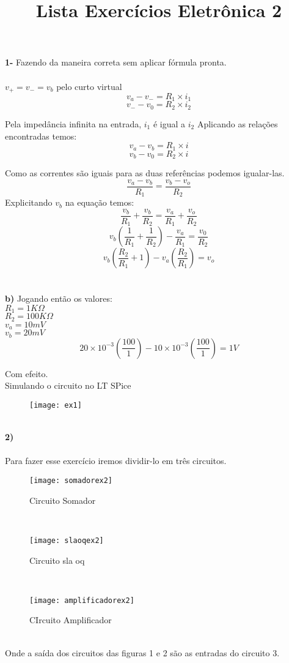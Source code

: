 \documentclass[11pt,a4paper]{article}
\title{Lista Exercícios Eletrônica 2}
\begin{document}
\maketitle
\textbf{1- }
Fazendo da maneira correta sem aplicar fórmula pronta.\\
\\
$v_+=v_-=v_b$ pelo curto virtual
$$v_a-v_-=R_1\times i_1$$
$$v_--v_0=R_2\times i_2$$

Pela impedância infinita na entrada, $i_1$ é igual a $i_2$ 
Aplicando as relações encontradas temos:
$$v_a-v_b=R_1\times i$$
$$v_b -v_0=R_2\times i$$

Como as correntes são iguais para as duas referências podemos igualar-las.\\
$$\frac{v_a-v_b}{R_1}=\frac{v_b-v_o}{R_2}$$
Explicitando $v_b$ na equação temos:\\
$$\frac{v_b}{R_1}+\frac{v_b}{R_2}=\frac{v_a}{R_1}+\frac{v_o}{R_2}$$
$$v_b \left(\frac{1}{R_1} + \frac{1}{R_2}    \right)-\frac{v_a}{R_1}=\frac{v_0}{R_2}$$
$$v_b\left( \frac{R_2}{R_1}+1 \right)-v_a\left( \frac{R_2}{R_1} \right)=v_o$$
\\\\
\textbf{b)}
Jogando então os valores:\\
$R_1=1 K\Omega$\\
$R_2=100K\Omega$\\
$v_a=10mV$\\
$v_b=20mV$\\
$$20\times 10^{-3} \left( \frac{100}{1} \right)-10 \times 10^{-3}\left( \frac{100}{1}  \right)=1 V$$

Com efeito.\\
Simulando o circuito no LT SPice\\
\begin{figure}[!h]
\begin{center}
\texttt{[image: ex1]}
\end{center}
\end{figure}
\\
\textbf{2) }\\\\
Para fazer esse exercício iremos dividir-lo em três circuitos.\\
\begin{figure}[!h]
\begin{center}
\texttt{[image: somadorex2]}
\caption{Circuito Somador}
\end{center}
\end{figure}
\\
\begin{figure}[!h]
\begin{center}
\texttt{[image: slaoqex2]}
\caption{Circuito sla oq}
\end{center}
\end{figure}
\\
\begin{figure}[!h]
\begin{center}
\texttt{[image: amplificadorex2]}
\caption{CIrcuito Amplificador}
\end{center}
\end{figure}
\\
Onde a saída dos circuitos das figuras 1 e 2 são as entradas do circuito 3.\\
\end{document}
